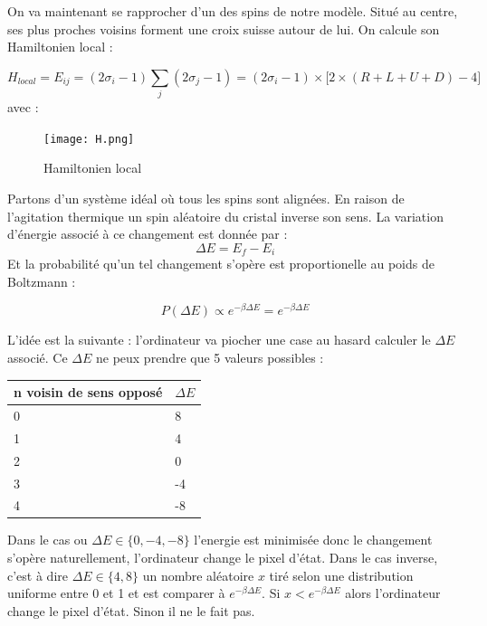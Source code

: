\documentclass[11pt, parskip=half]{scrartcl} %
\begin{document}
On va maintenant se rapprocher d'un des spins de notre modèle. Situé au centre, ses plus proches voisins forment une croix suisse autour de lui. On calcule son Hamiltonien local : 

\begin{equation*}
H_{local} = E_{ij} =  (2\sigma_{i}-1) \displaystyle \sum_{j}(2\sigma_{j}-1) = (2\sigma_{i}-1) \times \bigg[ 2\times( R + L + U + D ) -4 \bigg]
\end{equation*}
avec :

\begin{figure}[h]
	\centering
	\texttt{[image: H.png]}
	\caption{Hamiltonien local}
	\label{fig:H}
\end{figure}

Partons d'un système idéal où tous les spins sont alignées. En raison de l'agitation thermique un spin aléatoire du cristal inverse son sens. La variation d'énergie associé à ce changement est donnée par : 
\begin{equation*}
\Delta E = E_f - E_i
\end{equation*}
Et la probabilité qu'un tel changement s'opère est proportionelle au poids de Boltzmann :  

\begin{equation*}
P(\Delta E) \propto e^{-\beta \Delta E} = e^{-\beta \Delta E}
\end{equation*}

L'idée est la suivante :  l'ordinateur va piocher une case au hasard calculer le $\Delta E$ associé. Ce $\Delta E$ ne peux prendre que 5 valeurs possibles : 
\begin{center}
\begin{tabular}{|l|m{4cm}|}
\hline
n voisin de sens opposé & $\Delta E $\\
\hline
0 & 8\\
1 & 4\\ 
2 & 0\\ 
3 & -4\\
4 & -8\\\hline

\end{tabular}
\end{center}

\vspace{4mm}

 Dans le cas ou $\Delta E \in \{0,-4,-8\}$ l'energie est minimisée donc le changement s'opère naturellement, l'ordinateur change le pixel d'état.
 Dans le cas inverse, c'est à dire  $\Delta E \in \{4,8\}$ un nombre aléatoire $x$ tiré selon une distribution uniforme entre 0 et 1 et est comparer à $e^{-\beta \Delta E}$.
 Si $x < e^{-\beta \Delta E}$ alors l'ordinateur change le pixel d'état. Sinon il ne le fait pas.
\end{document}
